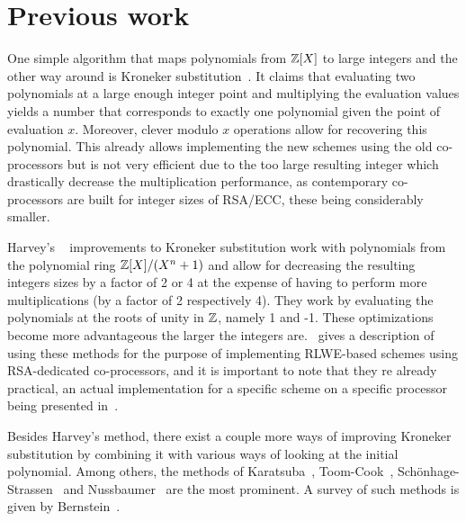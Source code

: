 \section{Previous work}

One simple algorithm that maps polynomials from $\mathbb{Z}[X]$ to large integers and the other way around is Kroneker substitution~\parencite{10.1007/3-540-11607-9_1}. It claims that evaluating two polynomials at a large enough integer point and multiplying the evaluation values yields a number that corresponds to exactly one polynomial given the point of evaluation $x$. Moreover, clever modulo $x$ operations allow for recovering this polynomial. This already allows implementing the new schemes using the old co-processors but is not very efficient due to the too large resulting integer which drastically decrease the multiplication performance, as contemporary co-processors are built for integer sizes of RSA/ECC, these being considerably smaller.

Harvey's ~\parencite{HARVEY20091502} improvements to Kroneker substitution work with polynomials from the polynomial ring $\mathbb{Z}[X]/(X^n + 1)$ and allow for decreasing the resulting integers sizes by a factor of 2 or 4 at the expense of having to perform more multiplications (by a factor of 2 respectively 4). They work by evaluating the polynomials at the roots of unity in $\mathbb{Z}$, namely 1 and -1. These optimizations become more advantageous the larger the integers are.~\parencite{cryptoeprint:2018/425} gives a description of using these methods for the purpose of implementing RLWE-based schemes using RSA-dedicated co-processors, and it is important to note that they re already practical, an actual implementation for a specific scheme on a specific processor being presented in~\parencite{10.1007/978-3-030-57808-4_21}.

Besides Harvey's method, there exist a couple more ways of improving Kroneker substitution by combining it with various ways of looking at the initial polynomial. Among others, the methods of Karatsuba~\parencite{karatsuba}, Toom-Cook~\parencite{Cook1969ONTM}, Schönhage-Strassen~\parencite{strassen} and Nussbaumer~\parencite{Nussbaumer1980FastPT} are the most prominent. A survey of such methods is given by Bernstein~\parencite{10.1007/978-3-030-57808-4_21}.

